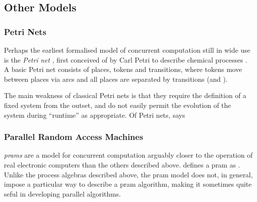 \subsection{\label{sec:back:othermodels}Other Models}

\subsubsection{Petri Nets}
Perhaps the earliest formalised model of concurrent computation still in wide use is the \emph{Petri net} \cite{Dennis2011}, first conceived of by Carl Petri to describe chemical processes \cite{Petri2008}.  A basic Petri net consists of places, tokens and transitions, where tokens move between places via arcs and all places are separated by transitions (and \viceversa).

The main weakness of classical Petri nets is that they require the definition of a fixed system from the outset, and do not easily permit the evolution of the system during ``runtime'' as appropriate.  Of Petri nets, \citeauthor{Varela2013} says 

\subsubsection{\label{sec:back:pram}Parallel Random Access Machines}

\emph{\Glspl{pram}} are a model for concurrent computation arguably closer to the operation of real electronic computers than the others described above.  \citeauthor{JaJa2011} defines a \gls{pram} as .  Unlike the process algebras described above, the \gls{pram} model does not, in general, impose a particular way to describe a \gls{pram} algorithm, making it sometimes quite seful in developing parallel algorithms.

